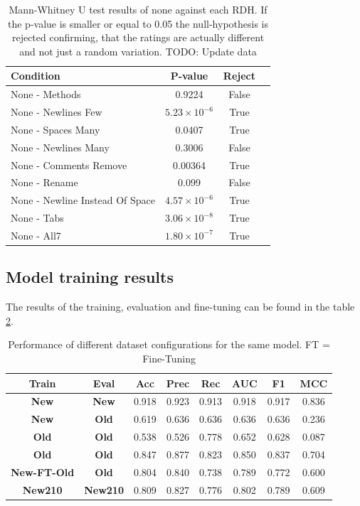 \documentclass[%
class=scrreprt,
chapterprefix=false,%
open=right,%
twoside=false,%
paper=a4,%
logofile={Logo\_zentral\_farbig\_EN.png},%
thesistype=master,%
UKenglish,%
]{se2thesis}
\theoremstyle{definition}
\begin{document}
	\begin{table}[h]
		\centering
		\begin{tabular}{lccc}
			\toprule
			\textbf{Condition} & \textbf{P-value} & \textbf{Reject} \\
			\midrule
			None - Methods & 0.9224 & False \\
			None - Newlines Few & $5.23 \times 10^{-6}$ & True \\
			None - Spaces Many & 0.0407 & True \\
			None - Newlines Many & 0.3006 & False \\
			None - Comments Remove & 0.00364 & True \\
			None - Rename & 0.099 & False \\
			None - Newline Instead Of Space & $4.57 \times 10^{-6}$ & True \\
			None - Tabs & $3.06 \times 10^{-8}$ & True \\
			None - All7 & $1.80 \times 10^{-7}$ & True \\
			\bottomrule
		\end{tabular}
		\caption{Mann-Whitney U test results of none against each RDH. If the p-value is smaller or equal to 0.05 the null-hypothesis is rejected confirming, that the ratings are actually different and not just a random variation. TODO: Update data}
		\label{tab:survey_statistical_evidence}
	\end{table}


\subsection{Model training results} \label{Model training results}
	The results of the training, evaluation and fine-tuning can be found in the table \ref{tab:dataset_performance}.
	
	\begin{table}[h]
		\centering
		\begin{tabular}{|c|c|c|c|c|c|c|c|}
			\hline
			\textbf{Train} & \textbf{Eval} & \textbf{Acc} & \textbf{Prec} & \textbf{Rec} & \textbf{AUC} & \textbf{F1} & \textbf{MCC} \\
			\hline
			\textbf{New} 		& \textbf{New} 	& 0.918 & 0.923 & 0.913 & 0.918 & 0.917 & 0.836 \\
			\textbf{New} 		& \textbf{Old}  	& 0.619 & 0.636 & 0.636 & 0.636 & 0.636 & 0.236 \\
			\textbf{Old} 		& \textbf{Old} 	& 0.538 & 0.526 & 0.778 & 0.652 & 0.628 & 0.087 \\
			\textbf{Old}  		& \textbf{Old}  	& 0.847 & 0.877 & 0.823 & 0.850 & 0.837 & 0.704 \\
			
			\textbf{New-FT-Old}& \textbf{Old}  	& 0.804 & 0.840 & 0.738 & 0.789 & 0.772 & 0.600 \\
			\textbf{New210}  	& \textbf{New210}  & 0.809 & 0.827 & 0.776 & 0.802 & 0.789 & 0.609 \\
			\hline
		\end{tabular}
		\caption{Performance of different dataset configurations for the same model. FT = Fine-Tuning}
		\label{tab:dataset_performance}
	\end{table}
		
\end{document}
